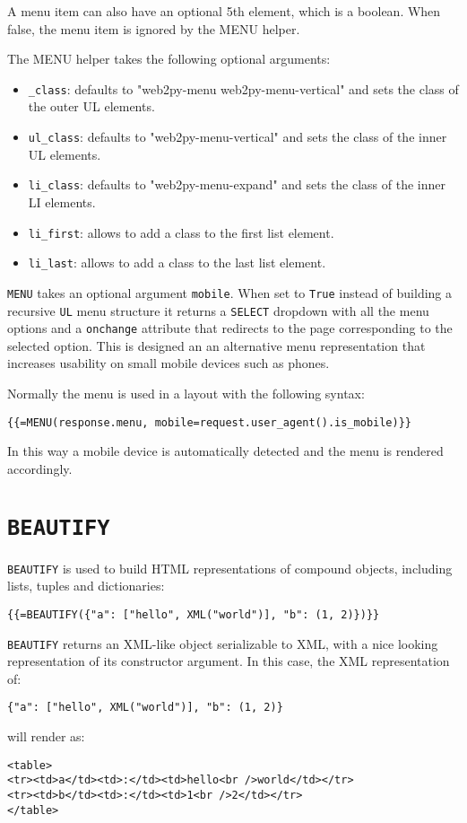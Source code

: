 \documentclass[justified,sixbynine,notoc]{tufte-book}
\def\ft{\small\tt}
\def\inxx#1{\index{#1}}
\begin{document}
\begin{fullwidth}
A menu item can also have an optional 5th element, which is a boolean. When false, the menu item is ignored by the MENU helper.

The MENU helper takes the following optional arguments:
\begin{itemize}
\item {\ft \_class}: defaults to "web2py-menu web2py-menu-vertical" and sets the class of the outer UL elements.

\item {\ft ul\_class}: defaults to "web2py-menu-vertical" and sets the class of the inner UL elements.

\item {\ft li\_class}: defaults to "web2py-menu-expand" and sets the class of the inner LI elements.

\item {\ft li\_first}: allows to add a class to the first list element.

\item {\ft li\_last}: allows to add a class to the last list element.
\end{itemize}

\inxx{mobile}

{\ft MENU} takes an optional argument {\ft mobile}. When set to {\ft True} instead of building a recursive {\ft UL} menu structure it returns a {\ft SELECT} dropdown with all the menu options and a {\ft onchange} attribute that redirects to the page corresponding to the selected option. This is designed an an alternative menu representation that increases usability on small mobile devices such as phones.

Normally the menu is used in a layout with the following syntax:

\begin{lstlisting}[keywords={}]
{{=MENU(response.menu, mobile=request.user_agent().is_mobile)}}
\end{lstlisting}

In this way a mobile device is automatically detected and the menu is rendered accordingly.

\goodbreak\section{{\ft BEAUTIFY}}

{\ft BEAUTIFY} is used to build HTML representations of compound objects, including lists, tuples and dictionaries:
\begin{lstlisting}[keywords={}]
{{=BEAUTIFY({"a": ["hello", XML("world")], "b": (1, 2)})}}
\end{lstlisting}
{\ft BEAUTIFY} returns an XML-like object serializable to XML, with a nice looking representation of its constructor argument. In this case, the XML representation of:
\begin{lstlisting}
{"a": ["hello", XML("world")], "b": (1, 2)}
\end{lstlisting}
\noindent will render as:
\begin{lstlisting}[keywords={}]
<table>
<tr><td>a</td><td>:</td><td>hello<br />world</td></tr>
<tr><td>b</td><td>:</td><td>1<br />2</td></tr>
</table>
\end{lstlisting}


\end{fullwidth}
\end{document}
